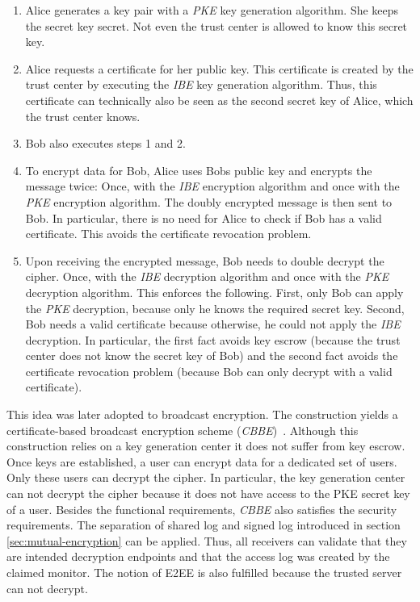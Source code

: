 \documentclass[../main.tex]{subfiles}
\begin{document}
\begin{enumerate}
    \item Alice generates a key pair with a \textit{PKE} key generation algorithm. She keeps the secret key secret. 
    Not even the trust center is allowed to know this secret key.
    \item Alice requests a certificate for her public key. 
    This certificate is created by the trust center by executing the \textit{IBE} key generation algorithm. 
    Thus, this certificate can technically also be seen as the second secret key of Alice, which the trust center knows.
    \item Bob also executes steps 1 and 2.
    \item To encrypt data for Bob, Alice uses Bobs public key and encrypts the message twice: Once, with the \textit{IBE} encryption algorithm and once with the \textit{PKE} encryption algorithm. The doubly encrypted message is then sent to Bob. In particular, there is no need for Alice to check if Bob has a valid certificate. This avoids the certificate revocation problem.
    \item Upon receiving the encrypted message, Bob needs to double decrypt the cipher. 
    Once, with the \textit{IBE} decryption algorithm and once with the \textit{PKE} decryption algorithm. 
    This enforces the following.
    First, only Bob can apply the \textit{PKE} decryption, because only he knows the required secret key. 
    Second, Bob needs a valid certificate because otherwise, he could not apply the \textit{IBE} decryption. 
    In particular, the first fact avoids key escrow (because the trust center does not know the secret key of Bob) and the second fact avoids the certificate revocation problem (because Bob can only decrypt with a valid certificate).
\end{enumerate}

This idea was later adopted to broadcast encryption.
The construction yields a certificate-based broadcast encryption scheme (\textit{CBBE})~\cite{Li2018}.
Although this construction relies on a key generation center it does not suffer from key escrow.
Once keys are established, a user can encrypt data for a dedicated set of users.
Only these users can decrypt the cipher.
In particular, the key generation center can not decrypt the cipher because it does not have access to the PKE secret key of a user.
Besides the functional requirements, \textit{CBBE} also satisfies the security requirements.
The separation of shared log and signed log introduced in section \ref{sec:mutual-encryption} can be applied.
Thus, all receivers can validate that they are intended decryption endpoints and that the access log was created by the claimed monitor.
The notion of E2EE is also fulfilled because the trusted server can not decrypt.
\end{document}
